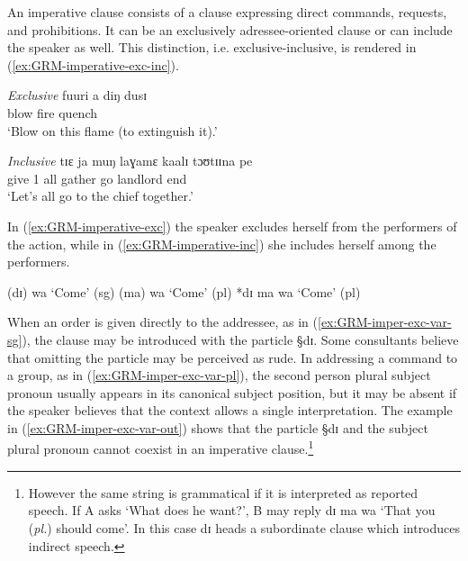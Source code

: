 An imperative clause consists of a clause  expressing
direct commands, requests, and prohibitions. It can be an exclusively 
adressee-oriented clause or  can include the speaker as well. This distinction,
i.e. exclusive-inclusive, is rendered in  (\ref{ex:GRM-imperative-exc-inc}). 

\begin{exe}
 \ex\label{ex:GRM-imperative-exc-inc}
\begin{xlist}
\ex\label{ex:GRM-imperative-exc}{\it Exclusive}
\gll fuuri a diŋ dusɪ\\
blow {\art} fire quench\\
\glt `Blow on this flame (to extinguish it).'

\ex\label{ex:GRM-imperative-inc}{\it Inclusive}
\gll tɪɛ ja muŋ laɣamɛ kaalɪ tɔʊtɪɪna  pe \\
give {1\pl} all gather go landlord end\\
\glt `Let's all go to the chief together.'

\end{xlist}
\end{exe}


In (\ref{ex:GRM-imperative-exc}) the  speaker excludes herself  from the
performers of the action, while in  (\ref{ex:GRM-imperative-inc}) 
she includes herself among the performers. 



\begin{exe}
 \ex\label{ex:GRM-imper-exc-var}
\begin{xlist}
\ex\label{ex:GRM-imper-exc-var-sg}  (dɪ) wa `Come' (sg)
\ex\label{ex:GRM-imper-exc-var-pl}  (ma) wa `Come' (pl)
\ex\label{ex:GRM-imper-exc-var-out}  *dɪ ma wa `Come' (pl)

\end{xlist}
\end{exe}

When an order is given directly to the addressee, as in 
(\ref{ex:GRM-imper-exc-var-sg}), the clause may be introduced with the
 particle {\S dɪ}. Some consultants believe that omitting the
particle may
be perceived as rude. In addressing a command to a group, as in 
(\ref{ex:GRM-imper-exc-var-pl}), the
second person plural subject pronoun  usually appears in its canonical subject
position, but it may be absent if the speaker believes that the context allows a
single interpretation. The example in (\ref{ex:GRM-imper-exc-var-out}) shows
that  the  particle {\S dɪ} and the subject plural pronoun cannot coexist in
an imperative clause.\footnote{However the same string is grammatical if it is
interpreted as reported speech. If A asks `What does he want?', B may reply
{\F dɪ  ma wa} `That you ({\it pl.}) should come'. In this case {\F dɪ}
heads a subordinate clause which introduces indirect speech. }

